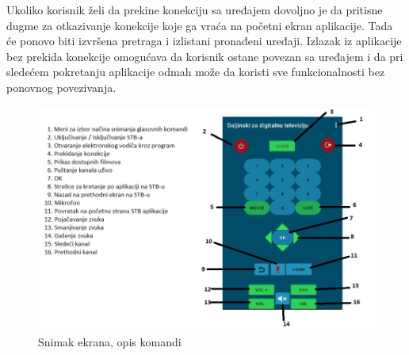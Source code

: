 \documentclass[implementacija.tex]{subfiles}
\begin{document}
Ukoliko korisnik želi da prekine konekciju sa uređajem dovoljno je da pritisne dugme za otkazivanje konekcije koje ga vraća na početni ekran aplikacije. Tada će ponovo biti izvršena pretraga i izlistani pronađeni uređaji. Izlazak iz aplikacije bez prekida konekcije omogućava da korisnik ostane povezan sa uređajem i da pri sledećem pokretanju aplikacije odmah može da koristi sve funkcionalnosti bez ponovnog povezivanja.

\begin{figure}[h!]
  \centering
  \includegraphics[width=\textwidth]{Implementacija/snimci_ekrana/komande_sa_opisom.jpg}
  \caption{Snimak ekrana, opis komandi}
   \label{fig:opis_komandi}
\end{figure}
\end{document}
